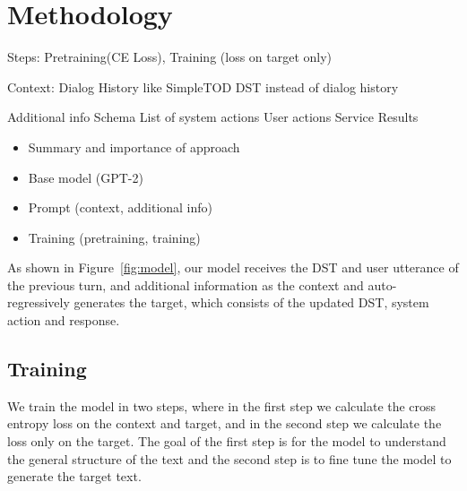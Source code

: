 \section{Methodology}

Steps: Pretraining(CE Loss), Training (loss on target only)

Context:
Dialog History like SimpleTOD
DST instead of dialog history

Additional info
Schema
List of system actions
User actions
Service Results

\begin{itemize}
    \item Summary and importance of approach
    \item Base model (GPT-2)
    \item Prompt (context, additional info)
    \item Training (pretraining, training)
\end{itemize}

As shown in Figure~\ref{fig:model}, our model receives the DST and user utterance of the previous turn, and additional information
as the context and auto-regressively generates the target, which consists of the updated DST, system action and response.


\subsection{Training}

We train the model in two steps, where in the first step we calculate the cross entropy loss on the context and target,
and in the second step we calculate the loss only on the target.
The goal of the first step is for the model to understand the general structure of the text
and the second step is to fine tune the model to generate the target text.

